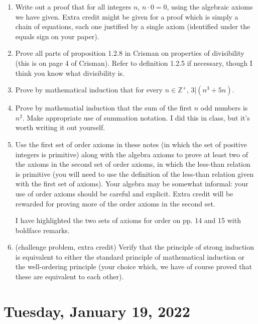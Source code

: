 \documentclass[12pt]{article}
\begin{document}
\begin{enumerate}

\item  Write out a proof that for all integers $n$, $n \cdot 0 = 0$, using the algebraic axioms we have given.  Extra credit might be given for a proof which is simply a chain of equations, each one justified by a single axiom (identified under the equals sign on your paper).

\item  Prove all parts of proposition 1.2.8 in Crisman on properties of divisibility (this is on page 4 of Crisman).  Refer to definition 1.2.5 if necessary, though I think you know what divisibility is.

\item  Prove by mathematical induction that for every $n \in {\mathbb Z}^+$, $3|(n^3+5n)$.

\item  Prove by mathematial induction that the sum of the first $n$ odd numbers is $n^2$.  Make appropriate use of summation notation.  I did this in class, but it's worth writing it out yourself.

\item Use the first set of order axioms in these notes (in which the set of positive integers is primitive) along with the algebra axioms to prove at least two of the axioms in the second set of order axioms, in which the less-than relation is primitive (you will need to use the definition of the less-than relation given with the first set of axioms).  Your algebra may be somewhat informal:  your use of order axioms should be careful and explicit.  Extra credit will be rewarded for proving more of the order axioms in the second set.

I have highlighted the two sets of axioms for order on pp. 14 and 15 with boldface remarks.

\item (challenge problem, extra credit)  Verify that the principle of strong induction is equivalent to either the standard principle of mathematical induction or the well-ordering principle (your choice which, we have of course proved that these are equivalent to each other).

\end{enumerate}

\section{Tuesday, January 19, 2022}
\end{document}
